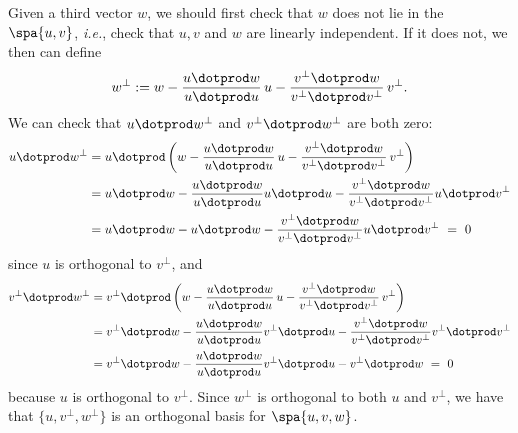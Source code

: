 Given a third vector $w$, we should first check that $w$ does not lie in the 
$\spa\{ u,v\} $, \textit{i.e.}, check that $u,v$ and $w$ are linearly independent.   If it does not, we then can define
\[
w^\perp := w - \frac{u\dotprod w}{u\dotprod u}\,u - \frac{v^\perp\dotprod w}{v^\perp\dotprod v^\perp}\,v^\perp.
\]
We can check that \(u \dotprod w^\perp\) and \(v^\perp \dotprod w^\perp\) are both zero:
\begin{align*}
u \dotprod w^\perp&=u \dotprod \left(w - \frac{u\dotprod w}{u\dotprod u}\,u - \frac{v^\perp\dotprod w}{v^\perp\dotprod v^\perp}\,v^\perp \right)\\&= u\dotprod w - \frac{u \dotprod w}{u \dotprod u}u \dotprod u - \frac{v^\perp \dotprod w}{v^\perp \dotprod v^\perp} u \dotprod v^\perp \\
&=u\dotprod w-u\dotprod w-\frac{v^\perp \dotprod w}{v^\perp \dotprod v^\perp} u \dotprod v^\perp\ =\ 0
\end{align*}
since \(u\) is orthogonal to \(v^\perp\), and
\begin{align*}
v^\perp \dotprod w^\perp&=v^\perp \dotprod \left(w - \frac{u\dotprod w}{u\dotprod u}\,u - \frac{v^\perp\dotprod w}{v^\perp\dotprod v^\perp}\,v^\perp \right)\\ &=v^\perp\dotprod w - \frac{u \dotprod w}{u \dotprod u}v^\perp \dotprod u - \frac{v^\perp \dotprod w}{v^\perp \dotprod v^\perp} v^\perp \dotprod v^\perp \\
&=v^\perp\dotprod w-\frac{u \dotprod w}{u \dotprod u}v^\perp \dotprod u - v^\perp \dotprod w\ =\ 0
\end{align*}
because \(u\) is orthogonal to \(v^\perp\). Since $w^\perp$ is orthogonal to both $u$ and $v^\perp$, we have that $\{u,v^\perp,w^\perp \}$ is an orthogonal basis for $\spa \{u,v,w\}$.

